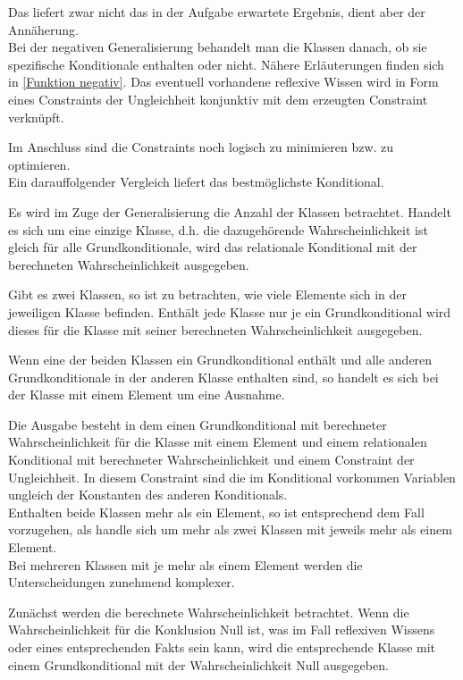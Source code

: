 \documentclass[a4paper, 11pt]{book}
\begin{document}
{Das liefert zwar nicht das in der Aufgabe erwartete Ergebnis, dient aber der Annäherung.\\
Bei der negativen Generalisierung behandelt man die Klassen danach, ob sie spezifische Konditionale enthalten oder nicht. Nähere Erläuterungen finden sich in \ref{Funktion negativ}.
Das eventuell vorhandene reflexive Wissen wird in Form eines Constraints der Ungleichheit konjunktiv mit dem erzeugten Constraint verknüpft.

Im Anschluss sind die Constraints noch logisch zu minimieren bzw. zu optimieren.\\
Ein darauffolgender Vergleich liefert das bestmöglichste Konditional.


Es wird im Zuge der Generalisierung die Anzahl der Klassen betrachtet. Handelt es sich um eine einzige Klasse, d.h. die dazugehörende Wahrscheinlichkeit ist gleich für alle Grundkonditionale, wird das relationale Konditional mit der berechneten Wahrscheinlichkeit ausgegeben.

Gibt es zwei Klassen, so ist zu betrachten, wie viele Elemente sich in der jeweiligen Klasse befinden. Enthält jede Klasse nur je ein Grundkonditional wird dieses für die Klasse mit seiner berechneten Wahrscheinlichkeit ausgegeben.

Wenn eine der beiden Klassen ein Grundkonditional enthält und alle anderen Grundkonditionale in der anderen Klasse enthalten sind, so handelt es sich bei der Klasse mit einem Element um eine Ausnahme.

Die Ausgabe besteht in dem einen Grundkonditional mit berechneter Wahrscheinlichkeit für die Klasse mit einem Element und einem relationalen Konditional mit berechneter Wahrscheinlichkeit und einem Constraint der Ungleichheit. In diesem Constraint sind die im Konditional vorkommen Variablen ungleich der Konstanten des anderen Konditionals.\\  

Enthalten beide Klassen mehr als ein Element, so ist entsprechend dem Fall vorzugehen, als handle sich um mehr als zwei Klassen mit jeweils mehr als einem Element.\\

Bei mehreren Klassen mit je mehr als einem Element werden die Unterscheidungen zunehmend komplexer.

Zunächst werden die berechnete Wahrscheinlichkeit betrachtet. Wenn die Wahrscheinlichkeit für die Konklusion Null ist, was im Fall reflexiven Wissens oder eines entsprechenden Fakts sein kann, wird die entsprechende Klasse mit einem Grundkonditional mit der Wahrscheinlichkeit Null ausgegeben.

}
\end{document}
